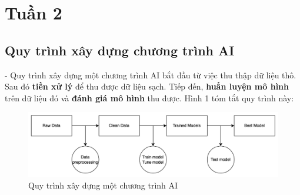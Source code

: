 \newpage
\section{Tuần 2}
\subsection{Quy trình xây dựng chương trình AI}

- Quy trình xây dựng một chương trình AI bắt đầu từ việc thu thập dữ liệu thô. Sau đó \textbf{tiền xử lý} để thu được dữ liệu sạch. Tiếp đến, \textbf{huấn luyện mô hình} trên dữ liệu đó và \textbf{đánh giá mô hình} thu được. Hình 1 tóm tắt quy trình này:

\begin{figure}[H]
    \centering
    \includegraphics[width=1\linewidth]{img/QuyTrinhAI.png}
    \caption{Quy trình xây dựng một chương trình AI}
    
\end{figure}
